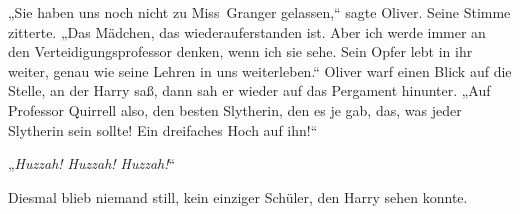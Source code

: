 „Sie haben uns noch nicht zu Miss~Granger gelassen,“ sagte Oliver. Seine Stimme zitterte. „Das Mädchen, das wiederauferstanden ist. Aber ich werde immer an den Verteidigungsprofessor denken, wenn ich sie sehe. Sein Opfer lebt in ihr weiter, genau wie seine Lehren in uns weiterleben.“ Oliver warf einen Blick auf die Stelle, an der Harry saß, dann sah er wieder auf das Pergament hinunter. „Auf Professor Quirrell also, den besten Slytherin, den es je gab, das, was jeder Slytherin sein sollte! Ein dreifaches Hoch auf ihn!“

„\emph{Huzzah! Huzzah! Huzzah!}“

Diesmal blieb niemand still, kein einziger Schüler, den Harry sehen konnte.

